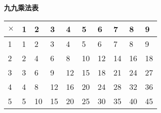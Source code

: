 \documentclass[12pt,UTF8]{ctexbook}
\begin{document}
\begin{center}
    
    {\LARGE \textbf{九九乘法表}}

    \begin{tabular}{ | p{2em}<{\centering} | p{2em}<{\centering} | p{2em}<{\centering} |  p{2em}<{\centering} | p{2em}<{\centering} | p{2em}<{\centering} | p{2em}<{\centering} | p{2em}<{\centering} | p{2em}<{\centering} | p{2em}<{\centering} |}
        \hline
        \cellcolor[RGB]{250,250,250}$\times$ & \phantom{0}1 & \phantom{0}2 & \phantom{0}3 & \phantom{0}4 & \phantom{0}5 & \phantom{0}6 & \phantom{0}7 & \phantom{0}8 & \phantom{0}9  \\  
        \hline
        1 & \cellcolor[RGB]{252,239,236}\phantom{0}1 & \cellcolor[RGB]{252,243,236}\phantom{0}2 & \cellcolor[RGB]{250,248,239}\phantom{0}3 & \cellcolor[RGB]{248,251,242}\phantom{0}4 & \cellcolor[RGB]{245,251,245}\phantom{0}5 & \cellcolor[RGB]{242,248,248}\phantom{0}6 & \cellcolor[RGB]{239,245,250}\phantom{0}7 & \cellcolor[RGB]{236,242,252}\phantom{0}8 & \cellcolor[RGB]{236,239,252}\phantom{0}9\\
        \hline
        2 & \cellcolor[RGB]{252,226,220}\phantom{0}2 & \cellcolor[RGB]{252,234,220}\phantom{0}4 & \cellcolor[RGB]{248,243,226}\phantom{0}6 & \cellcolor[RGB]{243,249,232}\phantom{0}8 & \cellcolor[RGB]{237,249,237}10 & \cellcolor[RGB]{232,244,243}12 & \cellcolor[RGB]{226,237,248}14 & \cellcolor[RGB]{220,231,252}16 & \cellcolor[RGB]{220,226,252}18\\
        \hline
        3 & \cellcolor[RGB]{253,214,205}\phantom{0}3 & \cellcolor[RGB]{253,226,205}\phantom{0}6 & \cellcolor[RGB]{247,239,214}\phantom{0}9 & \cellcolor[RGB]{239,248,222}12 & \cellcolor[RGB]{231,248,231}15 & \cellcolor[RGB]{222,241,239}18 & \cellcolor[RGB]{214,231,247}21 & \cellcolor[RGB]{205,221,253}24 & \cellcolor[RGB]{205,214,253}27\\
        \hline
        4 & \cellcolor[RGB]{253,200,189}\phantom{0}4 & \cellcolor[RGB]{253,216,189}\phantom{0}8 & \cellcolor[RGB]{245,234,201}12 & \cellcolor[RGB]{234,246,212}16 & \cellcolor[RGB]{223,246,223}20 & \cellcolor[RGB]{212,236,234}24 & \cellcolor[RGB]{201,223,245}28 & \cellcolor[RGB]{189,210,253}32 & \cellcolor[RGB]{189,201,253}36\\
        \hline
        5 & \cellcolor[RGB]{253,187,173}\phantom{0}5 & \cellcolor[RGB]{253,207,173}10 & \cellcolor[RGB]{243,230,187}15 & \cellcolor[RGB]{229,244,201}20 & \cellcolor[RGB]{215,244,215}25 & \cellcolor[RGB]{201,232,229}30 & \cellcolor[RGB]{187,215,243}35 & \cellcolor[RGB]{173,200,253}40 & \cellcolor[RGB]{173,188,253}45\\

\end{tabular}
\end{center}
\end{document}
